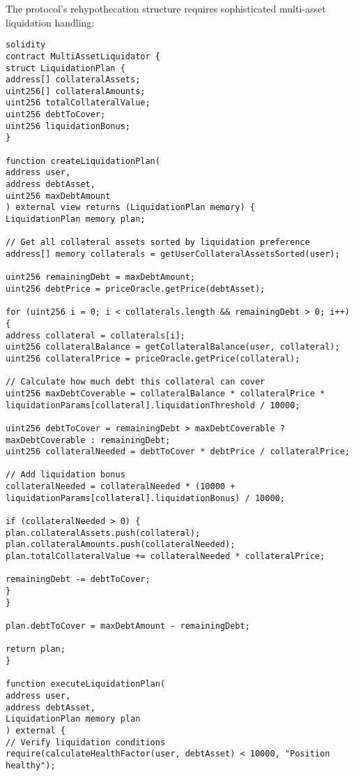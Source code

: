 \documentclass[12pt]{article}
\begin{document}
{{{ %

The protocol's rehypothecation structure requires sophisticated multi-asset liquidation handling:


\begin{lstlisting}
solidity
contract MultiAssetLiquidator {
struct LiquidationPlan {
address[] collateralAssets;
uint256[] collateralAmounts;
uint256 totalCollateralValue;
uint256 debtToCover;
uint256 liquidationBonus;
}

function createLiquidationPlan(
address user,
address debtAsset,
uint256 maxDebtAmount
) external view returns (LiquidationPlan memory) {
LiquidationPlan memory plan;

// Get all collateral assets sorted by liquidation preference
address[] memory collaterals = getUserCollateralAssetsSorted(user);

uint256 remainingDebt = maxDebtAmount;
uint256 debtPrice = priceOracle.getPrice(debtAsset);

for (uint256 i = 0; i < collaterals.length && remainingDebt > 0; i++) {
address collateral = collaterals[i];
uint256 collateralBalance = getCollateralBalance(user, collateral);
uint256 collateralPrice = priceOracle.getPrice(collateral);

// Calculate how much debt this collateral can cover
uint256 maxDebtCoverable = collateralBalance * collateralPrice *
liquidationParams[collateral].liquidationThreshold / 10000;

uint256 debtToCover = remainingDebt > maxDebtCoverable ? maxDebtCoverable : remainingDebt;
uint256 collateralNeeded = debtToCover * debtPrice / collateralPrice;

// Add liquidation bonus
collateralNeeded = collateralNeeded * (10000 + liquidationParams[collateral].liquidationBonus) / 10000;

if (collateralNeeded > 0) {
plan.collateralAssets.push(collateral);
plan.collateralAmounts.push(collateralNeeded);
plan.totalCollateralValue += collateralNeeded * collateralPrice;

remainingDebt -= debtToCover;
}
}

plan.debtToCover = maxDebtAmount - remainingDebt;

return plan;
}

function executeLiquidationPlan(
address user,
address debtAsset,
LiquidationPlan memory plan
) external {
// Verify liquidation conditions
require(calculateHealthFactor(user, debtAsset) < 10000, "Position healthy");


\end{lstlisting}}}}
\end{document}
